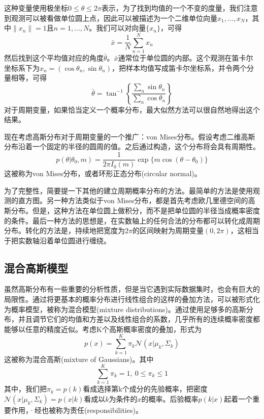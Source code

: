 这种变量使用极坐标$0\leqslant \theta \leqslant 2\pi$表示，为了找到均值的一个不变的度量，我们注意到观测可以被看做单位圆上点，因此可以被描述为一个二维单位向量$x_1,\dots,x_N$，其中$\lVert x_n\rVert=1$且$n=1,\dots,N$。我们可以对向量$\{x_n \}$，可得
\begin{equation}
	\bar{x}=\frac{1}{N}\sum_{n=1}^{N}x_n
\end{equation}
然后找到这个平均值对应的角度$\bar{\theta}$。$\bar{x}$通常位于单位圆的内部。这个观测在笛卡尔坐标系下为$x_n=(\cos \theta_n,\sin \theta_n)$，把样本均值写成笛卡尔坐标系，并令两个分量相等，可得
\begin{equation}
	\bar{\theta}=\tan^{-1}\left\{\frac{\sum_n\sin\theta_n}{\sum_n \cos\theta_n} \right\}
\end{equation}
对于周期变量，如果恰当定义一个概率分布，最大似然方法可以很自然地得出这个结果。

现在考虑高斯分布对于周期变量的一个推广：von Mises分布。假设考虑二维高斯分布沿着一个固定的半径的圆周的值。之后通过构造，这个分布将会具有周期性。
\begin{equation}
	p(\theta|\theta_0,m)=\frac{1}{2\pi I_0(m)}\exp\{m\cos (\theta -\theta_0) \}
\end{equation}
这被称为von Mises分布，或者环形正态分布(circular normal)。

为了完整性，简要提一下其他的建立周期概率分布的方法。最简单的方法是使用观测的直方图。另一种方法类似于von Mises分布，都是首先考虑欧几里德空间的高斯分布。但是，这种方法在单位圆上做积分，而不是把单位圆的半径当成概率密度的条件。最后一种方法的思想是，在实数轴上的任何合法的分布都可以转化成周期分布。转化的方法是，持续地把宽度为$2\pi$的区间映射为周期变量$(0,2\pi)$，这相当于把实数轴沿着单位圆进行缠绕。
\subsection*{混合高斯模型}
虽然高斯分布有一些重要的分析性质，但是当它遇到实际数据集时，也会有巨大的局限性。通过将更基本的概率分布进行线性组合的这样的叠加方法，可以被形式化为概率模型，被称为混合模型(mixture distributions)。通过使用足够多的高斯分布，并且调节它们的均值和方差以及线性组合的系数，几乎所有的连续概率密度都能够以任意的精度近似。考虑K个高斯概率密度的叠加，形式为
\begin{equation}
	p(x)=\sum_{k=1}^{K}\pi_k\mathcal{N}(x|\mu_k,\Sigma_k)
\end{equation}
这被称为混合高斯(mixture of Gaussians)。其中
\begin{equation}
	\sum_{k=1}^{K}\pi_k=1,\ 0\leqslant \pi_k \leqslant 1
\end{equation}
其中，我们把$\pi_k=p(k)$看成选择第k个成分的先验概率，把密度$\mathcal{N}(x|\mu_k,\Sigma_k)=p(x|k)$看成以$k$为条件的$x$的概率。后验概率$p(k|x)$起着一个重要作用，·经也被称为责任(responsibilities)。